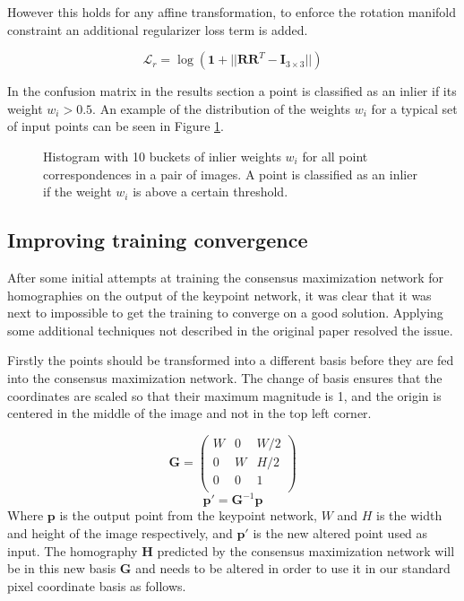 However this holds for any affine transformation, to enforce the rotation manifold constraint an additional regularizer loss term is added.

\[
\mathcal{L}_r=\log(\textbf{1} + || \textbf{R}\textbf{R}^T - \textbf{I}_{3\times3} ||)
\]

In the confusion matrix in the results section a point is classified as an inlier if its weight $w_i>0.5$. An example of the distribution of the weights $w_i$ for a typical set of input points can be seen in Figure \ref{fig:w-hist}.


\begin{figure}[H]
	\begin{center}
		
	\end{center}
	\caption{Histogram with 10 buckets of inlier weights $w_i$ for all point correspondences in a pair of images. A point is classified as an inlier if the weight $w_i$ is above a certain threshold.}
	\label{fig:w-hist}
\end{figure}

\subsection{Improving training convergence}

After some initial attempts at training the consensus maximization network for homographies on the output of the keypoint network, it was clear that it was next to impossible to get the training to converge on a good solution. Applying some additional techniques not described in the original paper resolved the issue.

Firstly the points should be transformed into a different basis before they are fed into the consensus maximization network. The change of basis ensures that the coordinates are scaled so that their maximum magnitude is 1, and the origin is centered in the middle of the image and not in the top left corner.

\begin{equation}
\textbf{G}=
\begin{pmatrix}
W & 0 & W/2 \\
0 & W & H/2 \\
0 & 0 & 1 \\
\end{pmatrix}
\end{equation}
\begin{equation}
\textbf{p}' = \textbf{G}^{-1} \textbf{p}
\end{equation}
Where $\textbf{p}$ is the output point from the keypoint network, $W$ and $H$ is the width and height of the image respectively, and $\textbf{p}'$ is the new altered point used as input. The homography $\textbf{H}$ predicted by the consensus maximization network will be in this new basis $\textbf{G}$ and needs to be altered in order to use it in our standard pixel coordinate basis as follows.

